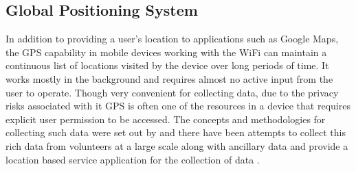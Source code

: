 \subsection{Global Positioning System}
In addition to providing a user’s location to applications such as Google Maps, the GPS capability in mobile devices working with the WiFi can maintain a continuous list of locations visited by the device over long periods of time.
It works mostly in the background and requires almost no active input from the user to operate.
Though very convenient for collecting data, due to the privacy risks associated with it GPS is often one of the resources in a device that requires explicit user permission to be accessed.
The concepts and methodologies for collecting such data were set out by \citep{asakura2004} and there have been attempts to collect this rich data from volunteers at a large scale along with ancillary data \citep{kiukkonen2010} and provide a location based service application for the collection of data \citep{ratti2006, jiang2006, ahas2005}.
 
